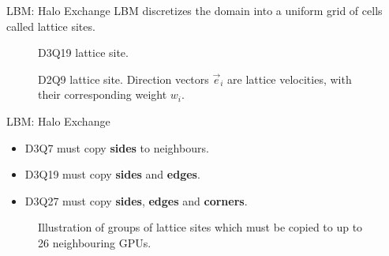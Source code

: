 \documentclass{beamer}
\begin{document}
\begin{frame}{LBM: Halo Exchange}
LBM discretizes the domain into a uniform grid of cells called lattice sites.
\begin{figure}[!htb]
\centering
\begin{minipage}[t]{.45\textwidth}
	\centering
	\begin{tiny}
	\def\svgwidth{0.9\linewidth}
	
	\end{tiny}
	\caption{D3Q19 lattice site.}
	\label{fig:d2q9_1}
\end{minipage}\qquad%
\begin{minipage}[t]{.45\textwidth}
	\centering
	\begin{tiny}
	\def\svgwidth{0.9\linewidth}
	
	\end{tiny}
	\caption{D2Q9 lattice site. Direction vectors $\vec{e}_i$ are lattice velocities, with their corresponding weight $w_i$.}
	\label{fig:d2q9_2}
\end{minipage}
\end{figure}
\end{frame}


\begin{frame}{LBM: Halo Exchange}
\begin{itemize}
\item D3Q7 must copy \textbf{sides} to neighbours.
\item D3Q19 must copy \textbf{sides} and \textbf{edges}.
\item D3Q27 must copy \textbf{sides}, \textbf{edges} and \textbf{corners}.
\end{itemize}
\begin{figure}[!htb]
\centering
	\begin{tiny}
	\def\svgwidth{0.9\linewidth}
	
	\end{tiny}
	\caption{Illustration of groups of lattice sites which must be copied to up to 26 neighbouring GPUs.}
	\label{fig:d2q9_1}
\end{figure}
\end{frame}
\end{document}
